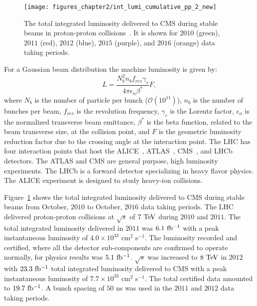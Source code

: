 \begin{figure}[h]
\centering
\texttt{[image: figures\_chapter2/int\_lumi\_cumulative\_pp\_2\_new]}
\caption{The total integrated luminosity delivered to CMS during stable beams in proton-proton collisions~\cite{lumi_plot}. It is shown for $2010$ (green), $2011$ (red), $2012$ (blue), $2015$ (purple), and $2016$ (orange) data taking periods.} 
\label{fig:int}
\end{figure}

For a Gaussian beam distribution the machine luminosity is given by:
\begin{equation} \label{eq:lumi_beam}
L = \frac{N_{b}^2n_bf_{rev}\gamma_{r}}{4\pi\epsilon_n\beta^{*}}F,
\end{equation}
where $N_b$ is the number of particle per bunch ($\mathcal{O}(10^{11})$), $n_b$ is the number of bunches per beam, $f_{rev}$ is the revolution frequency, $\gamma_r$ is the Lorentz factor, $\epsilon_n$ is the normalized transverse beam emittance, $\beta^{*}$ is the beta function, related to the beam transverse size, at the collision point, and $F$ is the geometric luminosity reduction factor due to the crossing angle at the interaction point.  The LHC has four interaction points that host the ALICE~\cite{Aamodt:2008zz}, ATLAS~\cite{Aad:2008zzm}, CMS~\cite{Chatrchyan:2008aa}, and LHCb~\cite{Alves:2008zz} detectors. The ATLAS and CMS are general purpose, high luminosity experiments. The LHCb is a forward detector specializing in heavy flavor physics. The ALICE experiment is designed to study heavy-ion collisions.   

Figure~\ref{fig:int} shows the total integrated luminosity delivered to CMS during stable beams from October, $2010$ to October, $2016$ data taking periods. The LHC delivered proton-proton collisions at $\sqrt{s}$ of $7~\mathrm{Te\kern -0.1em V}$ during $2010$ and $2011$. The total integrated luminosity delivered in $2011$ was $6.1~\mathrm{fb^{-1}}$ with a peak instantaneous luminosity of $4.0 \times 10^{33}$ cm$^2$ s$^{-1}$. The luminosity recorded and certified, where all the detector sub-components are confirmed to operate normally, for physics results was $5.1~\mathrm{fb^{-1}}$. $\sqrt{s}$ was increased to $8~\mathrm{Te\kern -0.1em V}$ in $2012$ with $23.3~\mathrm{fb^{-1}}$ total integrated luminosity delivered to CMS with a peak instantaneous luminosity of $7.7 \times 10^{33}$ cm$^2$ s$^{-1}$. The total certified data amounted to $19.7~\mathrm{fb^{-1}}$. A bunch spacing of $50$ ns was used in the $2011$ and $2012$ data taking periods. 

